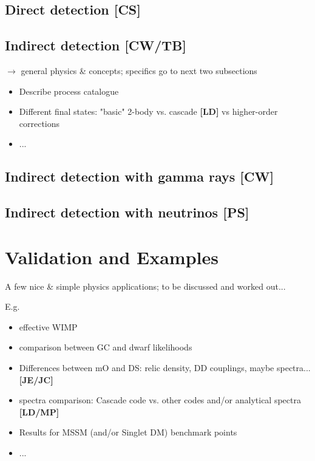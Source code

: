 \subsection{Direct detection {\bf [CS]}}
\label{code_dd}


\subsection{Indirect detection {\bf [CW/TB]}}
\label{code_id}

$\to$ general physics \& concepts; specifics go to next two subsections
\begin{itemize}
\item Describe process catalogue 
\item Different final states: "basic" 2-body vs. cascade {\bf [LD]} vs higher-order corrections
\item...
\end{itemize}

\subsection{Indirect detection with gamma rays {\bf [CW]}}
\label{code_ga}

\subsection{Indirect detection with neutrinos {\bf [PS]}}
\label{code_nu}



\section{Validation and  Examples}
\label{examples}

A few nice \& simple physics applications; to be discussed and worked out...

E.g.
\begin{itemize}
\item effective WIMP
\item comparison between GC and dwarf likelihoods
\item Differences between mO and DS: relic density, DD couplings, maybe spectra... {\bf [JE/JC]}
\item spectra comparison: Cascade code vs. other codes and/or analytical spectra {\bf [LD/MP]}
\item Results for MSSM (and/or Singlet DM) benchmark points
\item  ...
\end{itemize}

